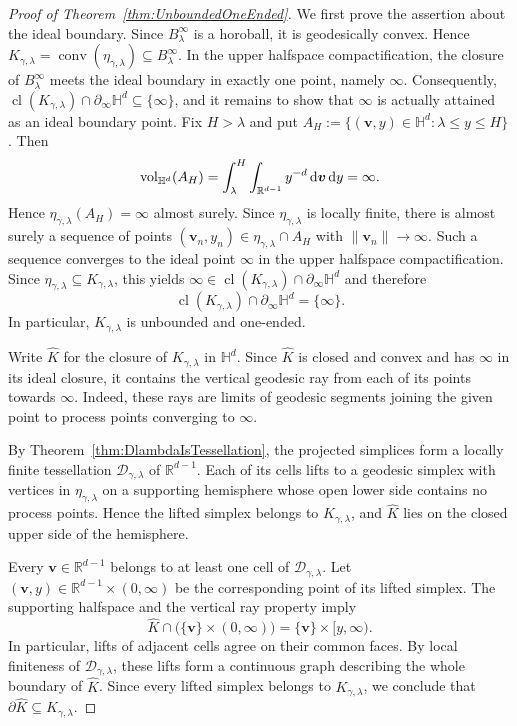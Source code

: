 \documentclass[11pt,a4paper]{article}
\theoremstyle{plain}
\theoremstyle{definition}
\theoremstyle{remark}
\newcommand{\dint}{\textup{d}}
\newcommand{\vol}{\mathop{\mathrm{vol}}\nolimits}
\newcommand{\bv}{\boldsymbol{v}}
\def\HH{\mathbb{H}}
\def\RR{\mathbb{R}}
\def\cD{\mathcal{D}}
\newcommand{\conv}{\mathop{\mathrm{conv}}\nolimits}
\begin{document}
\begin{proof}[Proof of Theorem~\ref{thm:UnboundedOneEnded}] 
	We first prove the assertion about the ideal boundary. Since $B_\lambda^\infty$
	is a horoball, it is geodesically convex. Hence $K_{\gamma,\lambda}=\conv(\eta_{\gamma,\lambda})\subseteq B_\lambda^\infty$.
	In the upper halfspace compactification, the closure of $B_\lambda^\infty$
	meets the ideal boundary in exactly one point, namely $\infty$.
	Consequently, $\operatorname{cl}(K_{\gamma,\lambda})\cap\partial_\infty\HH^d\subseteq \{\infty\}$, and it remains to show that $\infty$ is actually attained as an ideal
	boundary point. Fix $H>\lambda$ and put $A_H:=\{(\bv,y)\in\HH^d:\lambda\le y\le H\}$.
	Then
	\[
		\vol_{\HH^d}(A_H)
		=
		\int_\lambda^H\int_{\RR^{d-1}} y^{-d}\,\dint \bv\,\dint y
		=
		\infty .
	\]
	Hence $\eta_{\gamma,\lambda}(A_H)=\infty$ almost surely. Since
	$\eta_{\gamma,\lambda}$ is locally finite, there is almost surely a
	sequence of points $(\bv_n,y_n)\in\eta_{\gamma,\lambda}\cap A_H$
	with $\|\bv_n\|\to\infty$. Such a sequence converges to the ideal point
	$\infty$ in the upper halfspace compactification. Since
	$\eta_{\gamma,\lambda}\subseteq K_{\gamma,\lambda}$, this yields $\infty\in\operatorname{cl}(K_{\gamma,\lambda})\cap\partial_\infty\HH^d$ and therefore
	\[
		\operatorname{cl}(K_{\gamma,\lambda})\cap\partial_\infty\HH^d
		=
		\{\infty\}.
	\]
	In particular, $K_{\gamma,\lambda}$ is unbounded and one-ended.

Write $\widehat{K}$ for the closure of $K_{\gamma,\lambda}$
in $\HH^d$. Since $\widehat{K}$ is closed and convex and
has $\infty$ in its ideal closure, it contains the vertical
geodesic ray from each of its points towards $\infty$.
Indeed, these rays are limits of geodesic segments joining
the given point to process points converging to $\infty$.

By Theorem~\ref{thm:DlambdaIsTessellation}, the projected
simplices form a locally finite tessellation
$\cD_{\gamma,\lambda}$ of $\RR^{d-1}$. Each of its cells lifts to
a geodesic simplex with vertices in $\eta_{\gamma,\lambda}$
on a supporting hemisphere whose open lower side contains
no process points. Hence the lifted simplex belongs to
$K_{\gamma,\lambda}$, and $\widehat{K}$ lies on the closed
upper side of the hemisphere.

Every $\bv\in\RR^{d-1}$ belongs to at least one cell of $\cD_{\gamma,\lambda}$.
Let $(\bv,y)\in\RR^{d-1}\times(0,\infty)$ be the corresponding point of its lifted
simplex. The supporting halfspace and the vertical ray
property imply
\[
    \widehat{K}\cap\bigl(\{\bv\}\times(0,\infty)\bigr)
    =\{\bv\}\times[y,\infty).
\]
In particular, lifts of adjacent cells agree on their
common faces. By local finiteness of $\cD_{\gamma,\lambda}$, these lifts form a continuous
graph describing the whole boundary of $\widehat{K}$.
Since every lifted simplex belongs to $K_{\gamma,\lambda}$,
we conclude that $\partial\widehat{K}\subseteq K_{\gamma,\lambda}$.


\end{proof}
\end{document}
